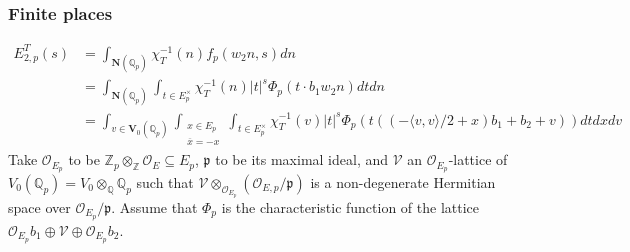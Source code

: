\documentclass[12pt]{article}
\theoremstyle{remark}
\theoremstyle{definition}
\newcommand{\oo}{\mathcal{O}}
\newcommand{\Z}{\mathbb{Z}}
\newcommand{\Q}{\mathbb{Q}}
\newcommand{\lrangle}[2]{\langle #1,#2\rangle}
\newcommand{\bff}[1]{\mathbf{#1}}
\newcommand{\call}[1]{\mathcal{#1}}
\newcommand{\frakk}[1]{\mathfrak{#1}}
\begin{document}
\subsubsection{Finite places}
\label{section finite place rank 2 Fourier} 
\begin{align*}
    E_{2,p}^{T}(s)&=\int_{\bff{N}(\Q_{p})}\chi_{T}^{-1}(n)f_{p}(w_{2}n,s)dn\\
    &=\int_{\bff{N}(\Q_{p})}\int_{t\in E_{p}^{\times}}\chi_{T}^{-1}(n)|t|^{s}\Phi_{p}(t\cdot b_{1}w_{2}n)dtdn\\
    &=\int_{v\in \bff{V}_{0}(\Q_{p})}\int_{\substack{x\in E_{p}\\ \overline{x}=-x}}\int_{t\in E_{p}^{\times}}\chi_{T}^{-1}(v)|t|^{s}\Phi_{p}\left(t\left(\left(-\lrangle{v}{v}/2+x\right)b_{1}+b_{2}+v\right)\right)dtdxdv
\end{align*}
Take $\oo_{E_{p}}$ to be $\Z_{p}\otimes_{\Z}\oo_{E}\subseteq E_{p}$,
$\frakk{p}$ to be its maximal ideal,
and $\call{V}$ an $\oo_{E_{p}}$-lattice of $V_{0}(\Q_{p})=V_{0}\otimes_{\Q}\Q_{p}$ 
such that $\call{V}\otimes_{\oo_{E_{p}}}\left(\oo_{E,p}/\frakk{p}\right)$ is a non-degenerate Hermitian space over $\oo_{E_{p}}/\frakk{p}$.
Assume that $\Phi_{p}$ is the characteristic function of the lattice 
$\oo_{E_{p}}b_{1}\oplus \call{V}\oplus \oo_{E_{p}}b_{2}$.
\end{document}
